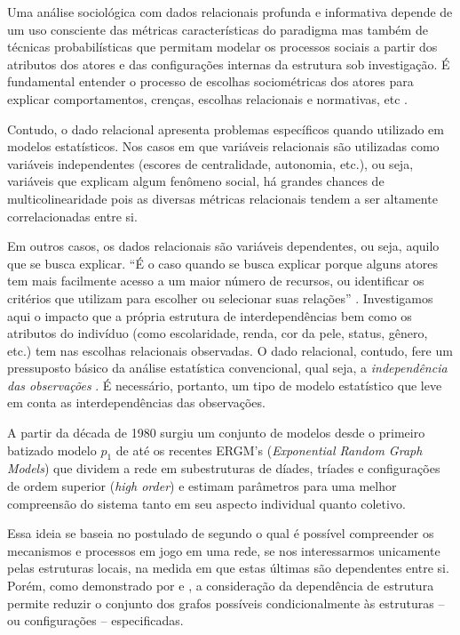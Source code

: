 \documentclass[a4paper, 12pt, openright, oneside, german, french, english, brazil]{abntex2}
\begin{document}
	Uma análise sociológica com dados relacionais profunda e informativa depende de um uso consciente das métricas características do paradigma mas também de técnicas probabilísticas que permitam modelar os processos sociais a partir dos atributos dos atores e das configurações internas da estrutura sob investigação. É fundamental entender o processo de escolhas sociométricas dos atores para explicar comportamentos, crenças, escolhas relacionais e normativas, etc \cite{lazega2014redes}.
	
	Contudo, o dado relacional apresenta problemas específicos quando utilizado em modelos estatísticos. Nos casos em que variáveis relacionais são utilizadas como variáveis independentes (escores de centralidade, autonomia, etc.), ou seja, variáveis que explicam algum fenômeno social, há grandes chances de multicolinearidade pois as diversas métricas relacionais tendem a ser altamente correlacionadas entre si.
	
	Em outros casos, os dados relacionais são variáveis dependentes, ou seja, aquilo que se busca explicar. ``É o caso quando se busca explicar porque alguns atores tem mais facilmente acesso a um maior número de recursos, ou identificar os critérios que utilizam para escolher ou selecionar suas relações'' \cite[p. 76]{lazega2014redes}. Investigamos aqui o impacto que a própria estrutura de interdependências bem como os atributos do indivíduo (como escolaridade, renda, cor da pele, status, gênero, etc.) tem nas escolhas relacionais observadas. O dado relacional, contudo, fere um pressuposto básico da análise estatística convencional, qual seja, a \textit{independência das observações} \cite{gujarati2011econometria}. É necessário, portanto, um tipo de modelo estatístico que leve em conta as interdependências das observações.
	
	A partir da década de 1980 surgiu um conjunto de modelos desde o primeiro batizado modelo $p_1$ de  até os recentes ERGM's (\textit{Exponential Random Graph Models}) que dividem a rede em subestruturas de díades, tríades e configurações de ordem superior (\textit{high order}) e estimam parâmetros para uma melhor compreensão do sistema tanto em seu aspecto individual quanto coletivo.
	
	\begin{citacao}
		Essa ideia se baseia no postulado de  segundo o qual é possível compreender os mecanismos e processos em jogo em uma rede, se nos interessarmos unicamente pelas estruturas locais, na medida em que estas últimas são dependentes entre si. Porém, como demonstrado por  e , a consideração da dependência de estrutura permite reduzir o conjunto dos grafos possíveis condicionalmente às estruturas -- ou configurações -- especificadas. \cite[p. 78]{lazega2014redes}
	\end{citacao}
	
\end{document}
